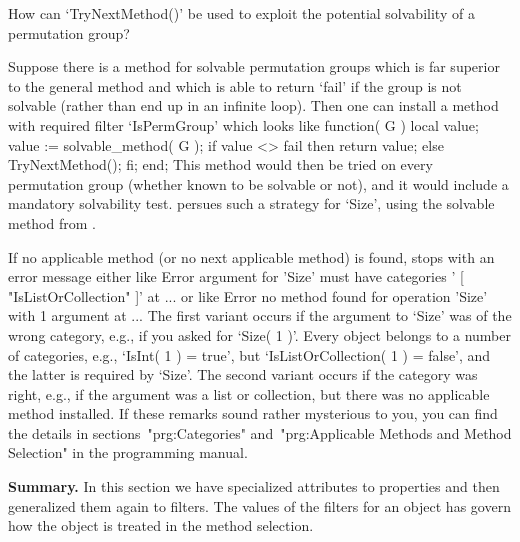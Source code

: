 %
\exercise How  can  `TryNextMethod()' be used   to exploit  the potential
solvability of a permutation group?

\answer Suppose  there is a method for  solvable permutation groups which
is far superior to the general method and which  is able to return `fail'
if the  group is not solvable  (rather than end up  in an infinite loop).
Then one can install a  method with  required filter `IsPermGroup'  which
looks like
\begintt
    function( G )
    local  value;
        value := solvable_method( G );
        if value <> fail  then  return value;
                          else  TryNextMethod();  fi;
    end;
\endtt
This method would then be tried on every permutation group (whether known
to be  solvable or  not),  and it would  include a  mandatory solvability
test.  {\GAP} persues  such  a strategy for   `Size',  using the solvable
method from \cite{Sims90b}.

\edef\solsimsex{\the\chapno.\the\exno}%
If no applicable method  (or no next applicable  method) is found, {\GAP}
stops with an error message either like
\begintt
    Error argument for 'Size' must have categories '
    [ "IsListOrCollection" ]' at ...
\endtt
or like
\begintt
    Error no method found for operation 'Size' with 1 argument at ...
\endtt
The  first variant occurs  if the  argument to   `Size' was of  the wrong
category, e.g., if you asked for `Size( 1 )'. Every {\GAP} object belongs
to  a  number of     categories,   e.g., `IsInt(   1    ) =  true',   but
`IsListOrCollection( 1 ) = false', and  the latter is required by `Size'.
The  second variant   occurs if the   category  was right, e.g.,   if the
argument  was a list  or collection,  but there  was no applicable method
installed. If these remarks sound rather mysterious  to you, you can find
the details in  sections~"prg:Categories" and~"prg:Applicable Methods and
Method Selection" in the programming manual.

{\bf  Summary.}  In   this section  we  have   specialized  attributes to
properties and then generalized them again to  filters. The values of the
filters for an object has govern how the  object is treated in the method
selection.

\null


